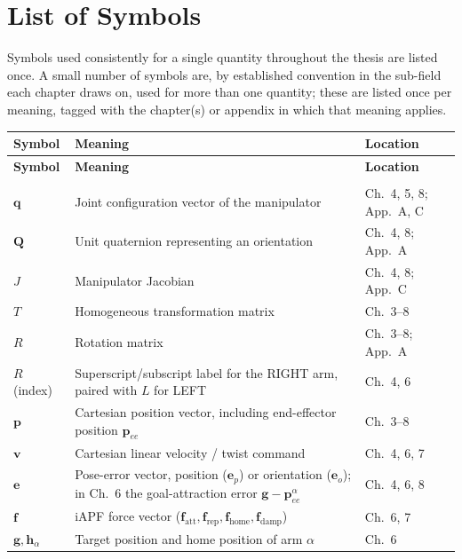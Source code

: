 \cleardoublepage
\chapter*{List of Symbols}
\makeatletter
{}
\makeatother

Symbols used consistently for a single quantity throughout the thesis are listed once. A small
number of symbols are, by established convention in the sub-field each chapter draws on, used for
more than one quantity; these are listed once per meaning, tagged with the chapter(s) or appendix in
which that meaning applies.

\begin{xltabular}{\textwidth}{@{}l X l@{}}
\toprule
\textbf{Symbol} & \textbf{Meaning} & \textbf{Location} \\
\midrule
\endfirsthead
\toprule
\textbf{Symbol} & \textbf{Meaning} & \textbf{Location} \\
\midrule
\endhead
\bottomrule
\endfoot
{} \\
\midrule
$\mathbf{q}$ & Joint configuration vector of the manipulator & Ch.~4, 5, 8; App.~A, C \\
$\mathbf{Q}$ & Unit quaternion representing an orientation & Ch.~4, 8; App.~A \\
$J$ & Manipulator Jacobian & Ch.~4, 8; App.~C \\
$T$ & Homogeneous transformation matrix & Ch.~3--8 \\
$R$ & Rotation matrix & Ch.~3--8; App.~A \\
$R$ (index) & Superscript/subscript label for the RIGHT arm, paired with $L$ for LEFT & Ch.~4, 6 \\
$\mathbf{p}$ & Cartesian position vector, including end-effector position $\mathbf{p}_{ee}$ & Ch.~3--8 \\
$\mathbf{v}$ & Cartesian linear velocity / twist command & Ch.~4, 6, 7 \\
$\mathbf{e}$ & Pose-error vector, position ($\mathbf{e}_p$) or orientation ($\mathbf{e}_o$); in Ch.~6 the goal-attraction error $\mathbf{g}-\mathbf{p}_{ee}^\alpha$ & Ch.~4, 6, 8 \\
$\mathbf{f}$ & iAPF force vector ($\mathbf{f}_{\text{att}}, \mathbf{f}_{\text{rep}}, \mathbf{f}_{\text{home}}, \mathbf{f}_{\text{damp}}$) & Ch.~6, 7 \\
$\mathbf{g}, \mathbf{h}_\alpha$ & Target position and home position of arm $\alpha$ & Ch.~6 \\

\end{xltabular}
